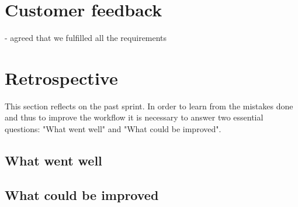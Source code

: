 \section{Customer feedback}
- agreed that we fulfilled all the requirements

\section{Retrospective}
This section reflects on the past sprint. In order to learn from the mistakes done and thus to improve the workflow it is necessary to answer two essential questions: "What went well" and "What could be improved".

\subsection{What went well}
\subsection{What could be improved}
